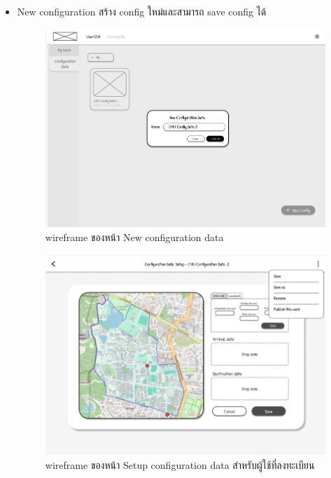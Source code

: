 \begin{mypara}
\begin{itemize}
\begin{itemize}
        \item New configuration สร้าง config ใหม่และสามารถ save config ได้
        \begin{figure}[H]
        \centering
        \includegraphics[scale=0.4]{new_conf.png}
        \caption{wireframe ของหน้า New configuration data}
        \label{fig:WireframeNewConfigLogin}
        \end{figure}
        \begin{figure}[H]
        \centering
        \includegraphics[scale=0.4]{conf_setup_reg.png}
        \caption{wireframe ของหน้า Setup configuration data สำหรับผู้ใช้ที่ลงทะเบียน}
        \label{fig:WireframeSetupConfigLogin}
        \end{figure}


\end{itemize}
\end{itemize}
\end{mypara}
